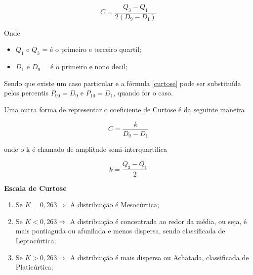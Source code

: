 \begin{equation}\label{curtose}
    C=\frac{Q_{3}-Q_{1}}{2(D_{9}-D_{1})}
\end{equation}

Onde

\begin{itemize}
  \item $Q_{1}$ e $Q_{3}$  = é o primeiro e terceiro quartil;
  \item $D_{1}$ e $D_{9}$  = é o primeiro e nono decil;
   \end{itemize}

\vskip0.3cm

Sendo que existe um caso particular e a fórmula \ref{curtose} pode ser substituída
pelos percentis $P_{90}=D_{9}$ e $P_{10}=D_{1}$, quando for o caso.




\vskip0.3cm
Uma outra forma de representar o coeficiente de Curtose é da seguinte maneira

\begin{equation}\label{curtose2}
    C= \frac{k}{D_{9}-D_{1}}
\end{equation}

onde o k é chamado de amplitude semi-interquartilica

\begin{equation}\label{curtose2}
    k= \frac{Q_{3}-Q_{1}}{2}
\end{equation}


\textbf{Escala de Curtose}

\begin{enumerate}
\item Se $K = 0,263 \Rightarrow $  A distribuição é Mesocúrtica;
\item Se $K < 0,263 \Rightarrow $  A distribuição é concentrada ao redor da média, ou seja, é mais pontiaguda ou afunilada e menos dispersa, sendo classificada de Leptocúrtica;
\item Se $K > 0,263 \Rightarrow $ A distribuição é mais dispersa ou Achatada, classificada de Platicúrtica;
\end{enumerate}
